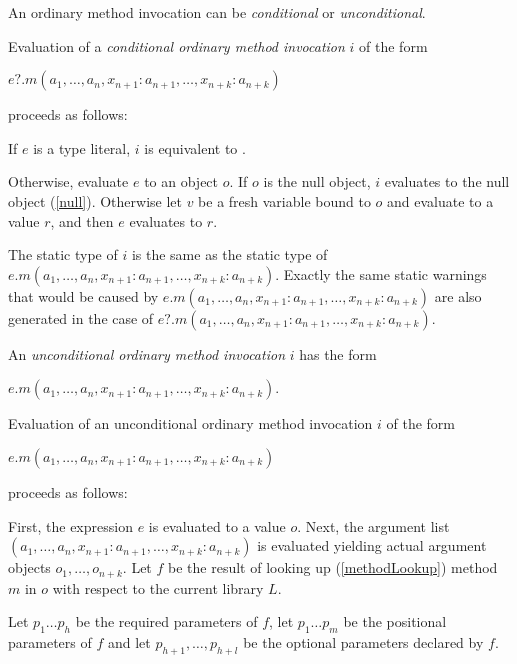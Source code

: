 \documentclass{article}
\begin{document}
\LMHash{}
An ordinary method invocation can be {\em conditional} or {\em unconditional}.

\LMHash{}
Evaluation of a {\em conditional ordinary method invocation} $i$ of the form

\LMHash{}
$e?.m(a_1, \ldots , a_n, x_{n+1}: a_{n+1}, \ldots , x_{n+k}: a_{n+k})$

\LMHash{}
proceeds as follows:

\LMHash{}
If $e$ is a type literal, $i$ is equivalent to .

\LMHash{}
Otherwise, evaluate $e$ to an object $o$.
If $o$ is the null object, $i$ evaluates to the null object (\ref{null}).
Otherwise let $v$ be a fresh variable bound to $o$ and evaluate
 to a value $r$, and then $e$ evaluates to $r$.

\LMHash{}
The static type of $i$ is the same as the static type of $e.m(a_1, \ldots , a_n, x_{n+1}: a_{n+1}, \ldots , x_{n+k}: a_{n+k})$.
Exactly the same static warnings that would be caused by $e.m(a_1, \ldots , a_n, x_{n+1}: a_{n+1}, \ldots , x_{n+k}: a_{n+k})$ are also generated in the case of $e?.m(a_1, \ldots , a_n, x_{n+1}: a_{n+1}, \ldots , x_{n+k}: a_{n+k})$.

\LMHash{}
An {\em unconditional ordinary method invocation} $i$ has the form

$e.m(a_1, \ldots , a_n, x_{n+1}: a_{n+1}, \ldots , x_{n+k}: a_{n+k})$.

\LMHash{}
Evaluation of an unconditional ordinary method invocation $i$ of the form

$e.m(a_1, \ldots , a_n, x_{n+1}: a_{n+1}, \ldots , x_{n+k}: a_{n+k})$

proceeds as follows:

\LMHash{}
First, the expression $e$ is evaluated to a value $o$.
Next, the argument list $(a_1, \ldots , a_n, x_{n+1}: a_{n+1}, \ldots , x_{n+k}: a_{n+k})$ is evaluated yielding actual argument objects $o_1, \ldots , o_{n+k}$.
Let $f$ be the result of looking up (\ref{methodLookup}) method $m$ in $o$ with respect to the current library $L$.

\LMHash{}
Let $p_1 \ldots p_h$ be the required parameters of $f$, let $p_1 \ldots p_m$ be the positional parameters of $f$ and let $p_{h+1}, \ldots, p_{h+l}$ be the optional parameters declared by $f$.

\end{document}
